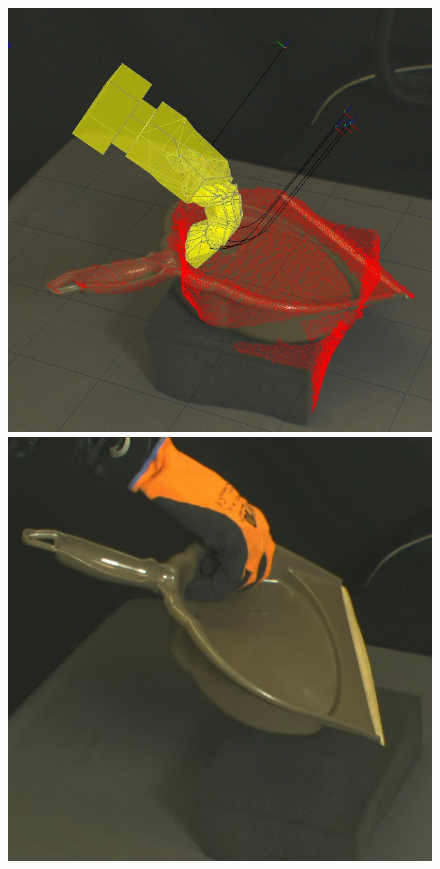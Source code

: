 \begin{figure}
\begin{center}
  \includegraphics[width=\tw]{images/experiments/query/dustpan-1-s} \hspace{-6pt}
 \includegraphics[width=\tw]{images/experiments/exec/dustpan-s}

\end{center}
\end{figure}
